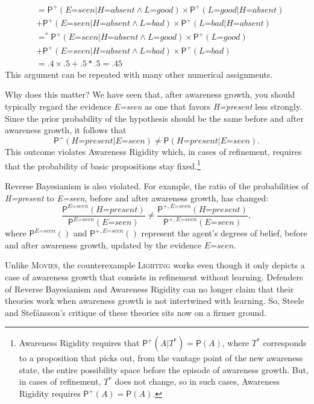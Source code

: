 \documentclass[
  11pt,
  dvipsnames,enabledeprecatedfontcommands]{scrartcl}
\newcommand{\pr}[1]{\ensuremath{\mathsf{P}(#1)}}
\newcommand{\ppr}[2]{\ensuremath{\mathsf{P}^{#1}(#2)}}
\begin{document}
{\begin{align*}
  &= \ppr{+}{\textit{E=seen} \vert \textit{H=absent} \wedge \textit{L=good}}  \times \ppr{+}{\textit{L=good} \vert  \textit{H=absent} }\\ & +\ppr{+}{\textit{E=seen}  \vert \textit{H=absent} \wedge \textit{L=bad}} \times \ppr{+}{\textit{L=bad} \vert  \textit{H=absent}}\\
  &=^* \ppr{+}{\textit{E=seen} \vert \textit{H=absent} \wedge \textit{L=good}}  \times \ppr{+}{\textit{L=good}}\\ & +\ppr{+}{\textit{E=seen}  \vert \textit{H=absent} \wedge \textit{L=bad}} \times \ppr{+}{\textit{L=bad}}\\
  &= .4 \times .5 +.5 *.5 = .45 
  \end{align*} This argument can be repeated with many other numerical
  assignments.}

Why does this matter? We have seen that, after awareness growth, you
should typically regard the evidence \textit{E=seen} as one that favors
\textit{H=present} less strongly. Since the prior probability of the
hypothesis should be the same before and after awareness growth, it
follows that
\[\ppr{+}{\textit{H=present} \vert \textit{E=seen}} \neq \pr{\textit{H=present} \vert \textit{E=seen}}.\]
This outcome violates Awareness Rigidity which, in cases of refinement,
requires that the probability of basic propositions stay
fixed.\footnote{Awareness Rigidity requires that
  \(\ppr{+}{A \vert T^*}=\pr{A}\), where \(T^*\) corresponds to a
  proposition that picks out, from the vantage point of the new
  awareness state, the entire possibility space before the episode of
  awareness growth. But, in cases of refinement, \(T^*\) does not
  change, so in such cases, Awareness Rigidity requires
  \(\ppr{+}{A}=\pr{A}\).}

Reverse Bayesianism is also violated. For example, the ratio of the
probabilities of \textit{H=present} to \textit{E=seen}, before and after
awareness growth, has changed:
\[\frac{\ppr{\textit{E=seen}}{\textit{H=present}}}{\ppr{ \textit{E=seen}}{\textit{E=seen}}} \neq \frac{\ppr{+, \textit{E=seen}}{\textit{H=present}}}{\ppr{+, \textit{E=seen}}{\textit{E=seen}}},\]
where \(\ppr{\textit{E=seen}}{}\) and \(\ppr{+, \textit{E=seen}}{}\)
represent the agent's degrees of belief, before and after awareness
growth, updated by the evidence \(\textit{E=seen}\).

Unlike \textsc{Movies}, the counterexample \textsc{Lighting} works even
though it only depicts a case of awareness growth that consists in
refinement without learning. Defenders of Reverse Bayesianism and
Awareness Rigidity can no longer claim that their theories work when
awareness growth is not intertwined with learning. So, Steele and
Stefánsson's critique of these theories sits now on a firmer ground.
\end{document}
